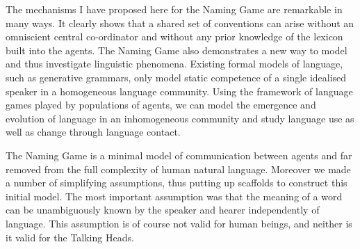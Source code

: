 The mechanisms I have proposed here for the Naming Game are
remarkable in many ways. It clearly shows that a
shared set of conventions
can arise without an omniscient central co-ordinator and
without any prior knowledge of the lexicon built into 
the agents. The Naming Game also demonstrates
a new way to model and thus
investigate linguistic phenomena. Existing formal models
of language, such as generative grammars, only model static
competence of a single idealised speaker in a homogeneous language
community. Using the framework of language games 
played by populations of agents, we can model the 
emergence and evolution of language in an inhomogeneous community
and study language use as well as change 
through language contact. 

The Naming Game is a minimal model of communication 
between agents and far removed from the full complexity 
of human natural language. Moreover we made a number of 
simplifying assumptions, thus putting up scaffolds to
construct this initial model. The most important assumption
was that the meaning of a word can be unambiguously 
known by the speaker and hearer independently of language. 
This assumption is of course not valid for human 
beings, and neither is it valid for the Talking Heads. 



